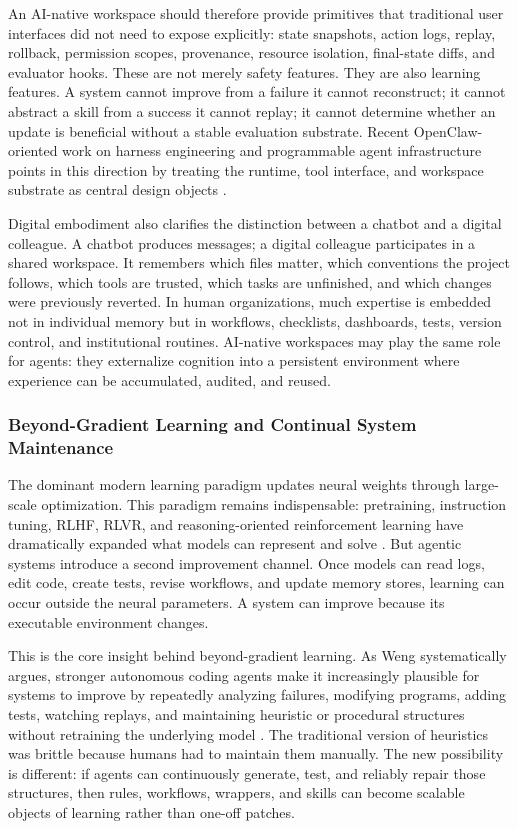 An AI-native workspace should therefore provide primitives that traditional user interfaces did not need to expose explicitly: state snapshots, action logs, replay, rollback, permission scopes, provenance, resource isolation, final-state diffs, and evaluator hooks. These are not merely safety features. They are also learning features. A system cannot improve from a failure it cannot reconstruct; it cannot abstract a skill from a success it cannot replay; it cannot determine whether an update is beneficial without a stable evaluation substrate. Recent OpenClaw-oriented work on harness engineering and programmable agent infrastructure points in this direction by treating the runtime, tool interface, and workspace substrate as central design objects \citep{zhu2026semaclaw,wang2026semacode}.

Digital embodiment also clarifies the distinction between a chatbot and a digital colleague. A chatbot produces messages; a digital colleague participates in a shared workspace. It remembers which files matter, which conventions the project follows, which tools are trusted, which tasks are unfinished, and which changes were previously reverted. In human organizations, much expertise is embedded not in individual memory but in workflows, checklists, dashboards, tests, version control, and institutional routines. AI-native workspaces may play the same role for agents: they externalize cognition into a persistent environment where experience can be accumulated, audited, and reused.

\subsubsection{Beyond-Gradient Learning and Continual System Maintenance}

The dominant modern learning paradigm updates neural weights through large-scale optimization. This paradigm remains indispensable: pretraining, instruction tuning, RLHF, RLVR, and reasoning-oriented reinforcement learning have dramatically expanded what models can represent and solve \citep{openai2024o1,deepseek2025r1}. But agentic systems introduce a second improvement channel. Once models can read logs, edit code, create tests, revise workflows, and update memory stores, learning can occur outside the neural parameters. A system can improve because its executable environment changes.

This is the core insight behind beyond-gradient learning. As Weng systematically argues, stronger autonomous coding agents make it increasingly plausible for systems to improve by repeatedly analyzing failures, modifying programs, adding tests, watching replays, and maintaining heuristic or procedural structures without retraining the underlying model \citep{weng2026learningbeyondgradients}. The traditional version of heuristics was brittle because humans had to maintain them manually. The new possibility is different: if agents can continuously generate, test, and reliably repair those structures, then rules, workflows, wrappers, and skills can become scalable objects of learning rather than one-off patches.

